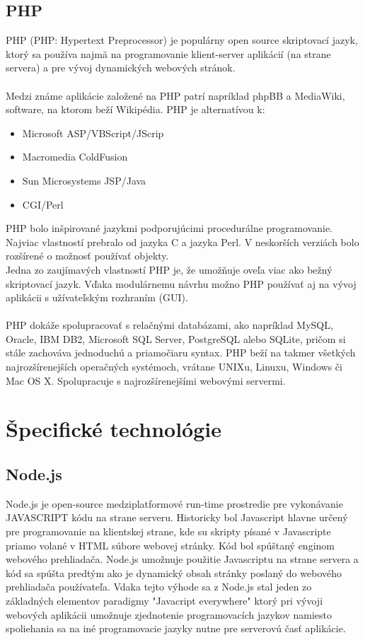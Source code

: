 \subsection{PHP}
PHP (PHP: Hypertext Preprocessor) je populárny open source skriptovací jazyk, ktorý sa používa najmä na programovanie klient-server aplikácií (na strane servera) a pre vývoj dynamických webových stránok.
\\
\\
Medzi známe aplikácie založené na PHP patrí napríklad phpBB a MediaWiki, software, na ktorom beží Wikipédia. PHP je alternatívou k:\\
\begin{itemize}
	\item Microsoft ASP/VBScript/JScrip
	\item Macromedia ColdFusion
	\item Sun Microsystems JSP/Java
	\item CGI/Perl
	
\end{itemize}
PHP bolo inšpirované jazykmi podporujúcimi procedurálne programovanie. Najviac vlastností prebralo od jazyka C a jazyka Perl. V neskorších verziách bolo rozšírené o možnosť používať objekty.\\
Jedna zo zaujímavých vlastností PHP je, že umožňuje oveľa viac ako bežný skriptovací jazyk. Vďaka modulárnemu návrhu možno PHP používať aj na vývoj aplikácii s užívateľským rozhraním (GUI).\\
\\
PHP dokáže spolupracovať s relačnými databázami, ako napríklad MySQL, Oracle, IBM DB2, Microsoft SQL Server, PostgreSQL alebo SQLite, pričom si stále zachováva jednoduchú a priamočiaru syntax. PHP beží na takmer všetkých najrozšírenejších operačných systémoch, vrátane UNIXu, Linuxu, Windows či Mac OS X. Spolupracuje s najrozšírenejšími webovými servermi.


\section{Špecifické technológie}
\subsection{Node.js}

Node.js je open-source medziplatformové run-time prostredie pre vykonávanie JAVASCRIPT kódu na strane serveru. Historicky bol Javascript hlavne určený pre programovanie na klientskej strane, kde su skripty písané v Javascripte priamo volané v HTML súbore webovej stránky. Kód bol spúštaný enginom webového prehliadača. Node.js umožnuje použitie Javascriptu na strane servera a kód sa spúšta predtým ako je dynamický obsah stránky poslaný do webového prehliadača používateľa. Vdaka tejto výhode sa z Node.js stal jeden zo základných elementov paradigmy "Javacript everywhere" ktorý pri vývoji webových aplikácii umožnuje zjednotenie programovacích jazykov namiesto spoliehania sa na iné programovacie jazyky nutne pre serverovú časť aplikácie.

